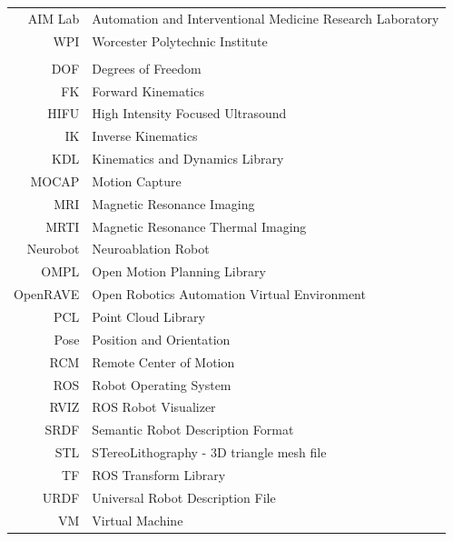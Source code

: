 \documentclass[12pt]{report}
\begin{document}
\begin{tabular}{rl}
	AIM Lab& Automation and Interventional Medicine Research Laboratory\\
	WPI& Worcester Polytechnic Institute\\
	\\
	DOF& Degrees of Freedom\\
    FK& Forward Kinematics\\
    HIFU& High Intensity Focused Ultrasound\\
    IK& Inverse Kinematics\\
    KDL& Kinematics and Dynamics Library\\
	MOCAP& Motion Capture\\
    MRI& Magnetic Resonance Imaging\\
    MRTI& Magnetic Resonance Thermal Imaging\\
    Neurobot& Neuroablation Robot\\
    OMPL& Open Motion Planning Library\\
    OpenRAVE& Open Robotics Automation Virtual Environment\\
    PCL& Point Cloud Library\\
	Pose& Position and Orientation\\
    RCM& Remote Center of Motion\\
	ROS& Robot Operating System\\
	RVIZ& ROS Robot Visualizer \\
    SRDF& Semantic Robot Description Format\\
    STL& STereoLithography - 3D triangle mesh file\\
	TF& ROS Transform Library\\
	URDF& Universal Robot Description File\\
    VM& Virtual Machine\\
\end{tabular}

\todototoc
\listoftodos


\clearpage

\setcounter{page}{1}

\end{document}
